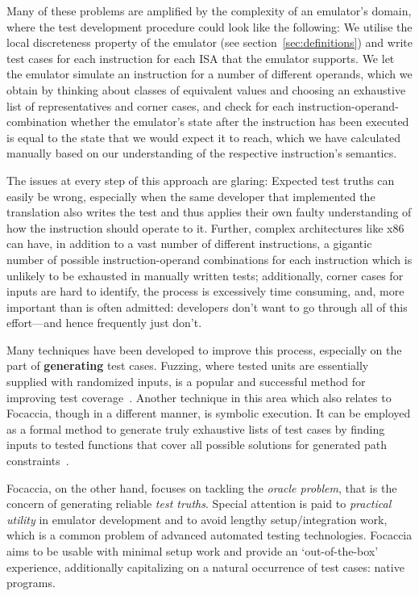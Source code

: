 Many of these problems are amplified by the complexity of an emulator's domain, where the test development procedure
could look like the following: We utilise the local discreteness property of the emulator (see
section~\ref{sec:definitions}) and write test cases for each instruction for each ISA that the emulator supports. We let
the emulator simulate an instruction for a number of different operands, which we obtain by thinking about classes of
equivalent values and choosing an exhaustive list of representatives and corner cases, and check for each
instruction-operand-combination whether the emulator's state after the instruction has been executed is equal to the
state that we would expect it to reach, which we have calculated manually based on our understanding of the respective
instruction's semantics.

The issues at every step of this approach are glaring: Expected test truths can easily be wrong, especially when the
same developer that implemented the translation also writes the test and thus applies their own faulty understanding of
how the instruction should operate to it. Further, complex architectures like x86 can have, in addition to a vast number
of different instructions, a gigantic number of possible instruction-operand combinations for each instruction which is
unlikely to be exhausted in manually written tests; additionally, corner cases for inputs are hard to identify, the
process is excessively time consuming, and, more important than is often admitted: developers don't want to go through
all of this effort---and hence frequently just don't.

Many techniques have been developed to improve this process, especially on the part of \textbf{generating} test cases.
Fuzzing, where tested units are essentially supplied with randomized inputs, is a popular and successful method for
improving test coverage~\cite{Zhu+2022Fuzzing}. Another technique in this area which also relates to Focaccia, though in
a different manner, is symbolic execution. It can be employed as a formal method to generate truly exhaustive lists of
test cases by finding inputs to tested functions that cover all possible solutions for generated path
constraints~\cite{Li2011SymbexecTestGeneration}.

Focaccia, on the other hand, focuses on tackling the \textit{oracle problem}, that is the concern of generating reliable
\textit{test truths}. Special attention is paid to \textit{practical utility} in emulator development and to avoid
lengthy setup/integration work, which is a common problem of advanced automated testing technologies. Focaccia aims to
be usable with minimal setup work and provide an `out-of-the-box' experience, additionally capitalizing on a natural
occurrence of test cases: native programs.

